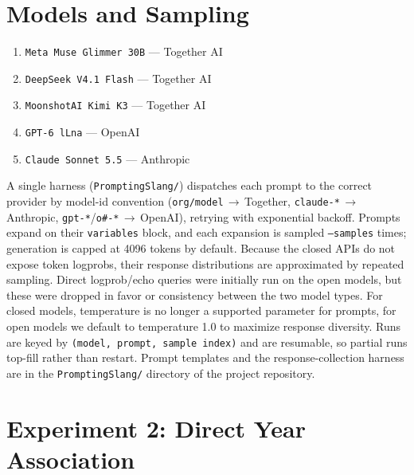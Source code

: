 \documentclass[11pt]{article}
\begin{document}
\section{Models and Sampling}%
\label{app:models}

\begin{enumerate}\itemsep2pt
  \item \texttt{Meta Muse Glimmer 30B} --- Together AI
  \item \texttt{DeepSeek V4.1 Flash} --- Together AI
  \item \texttt{MoonshotAI Kimi K3} --- Together AI
  \item \texttt{GPT-6 lLna} --- OpenAI
  \item \texttt{Claude Sonnet 5.5} --- Anthropic
\end{enumerate}

\noindent A single harness (\texttt{PromptingSlang/}) dispatches each prompt to the correct provider by model-id convention (\texttt{org/model}\,$\to$\,Together, \texttt{claude-*}\,$\to$\,Anthropic, \texttt{gpt-*}/\texttt{o\#-*}\,$\to$\,OpenAI), retrying with exponential backoff. Prompts expand on their \texttt{variables} block, and each expansion is sampled \texttt{--samples} times; generation is capped at 4096 tokens by default. Because the closed APIs do not expose token logprobs, their response distributions are approximated by repeated sampling. Direct logprob/echo queries were initially run on the open models, but these were dropped in favor or consistency between the two model types. For closed models, temperature is no longer a supported parameter for prompts, for open models we default to temperature 1.0 to maximize response diversity. Runs are keyed by \texttt{(model, prompt, sample index)} and are resumable, so partial runs top-fill rather than restart. Prompt templates and the response-collection harness are in the \texttt{PromptingSlang/} directory of the project repository.

\section{Experiment 2: Direct Year Association}%
\label{app:exp2}
\end{document}
